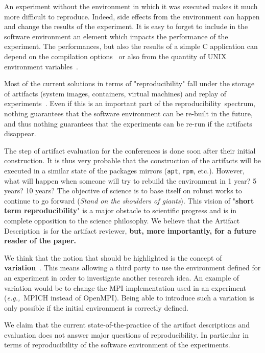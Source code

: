 \documentclass[sigconf,natbib=false]{acmart}
\newcommand{\repro}{reproducibility}
\newcommand{\eg}{\emph{e.g.,}}
\newcommand{\ad}{Artifact Description}
\begin{document}
An experiment without the environment in which it was executed makes it much more difficult to reproduce.
Indeed, side effects from the environment can happen and change the results of the experiment.
It is easy to forget to include in the software environment an element which impacts the performance of the experiment.
The performances, but also the results of a simple C application can depend on the compilation options\ \cite{stodden2018assessing} or also from the quantity of UNIX environment variables\ \cite{mytkowicz2009producing}.

Most of the current solutions in terms of "\repro" fall under the storage of artifacts (system images, containers, virtual machines) and replay of experiments\ \cite{rosendo2020e2clab, brammer2011paper, brinckman2019computing}.
Even if this is an important part of the \repro\ spectrum, nothing guarantees that the software environment can be re-built in the future, and thus nothing guarantees that the experiments can be re-run if the artifacts disappear. 


The step of artifact evaluation for the conferences is done soon after their initial construction.
It is thus very probable that the construction of the artifacts will be executed in a similar state of the packages mirrors (\texttt{apt}, \texttt{rpm}, etc.).
However, what will happen when someone will try to rebuild the environment in 1 year? 5 years? 10 years?
The objective of science is to base itself on robust works to continue to go forward (\emph{Stand on the shoulders of giants}).
This vision of "\textbf{short term reproducibility}" is a major obstacle to scientific progress and is in complete opposition to the science philosophy.
We believe that the \ad\ is for the artifact reviewer, \textbf{but, more importantly, for a future reader of the paper.}


We think that the notion that should be highlighted is the concept of \textbf{variation}\ \cite{mercier2018considering, feitelson_repeatability_2015}.
This means allowing a third party to use the environment defined for an experiment in order to investigate another research idea.
An example of variation would be to change the MPI implementation used in an experiment (\eg\ MPICH instead of OpenMPI).
Being able to introduce such a variation is only possible if the initial environment is correctly defined.

We claim that the current state-of-the-practice of the artifact descriptions and evaluation does not answer major questions of reproducibility.
In particular in terms of reproducibility of the software environment of the experiments.
\end{document}
